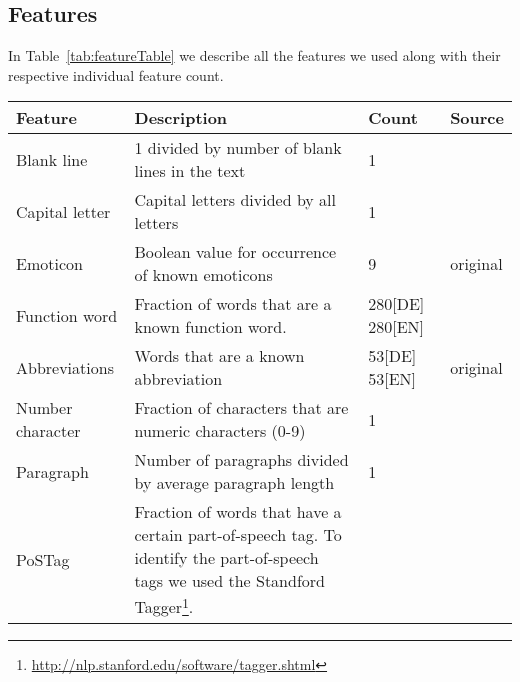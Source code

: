 \subsection{Features}
\label{sec:impl_features}

\begin{savenotes}


In Table~\ref{tab:featureTable} we describe all the features we used along with their respective individual feature count.


\begin{table}[ht!]
    \begin{center}
    \begin{tabular}{p{2.6cm}|p{6cm}|p{1.2cm}|p{1.2cm}}
    Feature                 & Description                                                               & Count             & Source\\ \hline \hline
    Blank line               & 1 divided by number of blank lines in the text                            & 1                 & \cite{de2001mining}\\ \hline
    Capital letter           & Capital letters divided by all letters                                    & 1                 & \cite{argamon2003style} \cite{de2001mining}\\ \hline
    Emoticon                & Boolean value for occurrence of known emoticons                           & 9                 & original\\ \hline
    Function word            & Fraction of words that are a known function word.                         & 280[DE] 280[EN]   & \cite{argamon2003style} \cite{de2001mining} \cite{madigan2005author} \cite{narayanan2012feasibility}\\ \hline
    Abbreviations           & Words that are a known abbreviation                                       & 53[DE] 53[EN]     & original\\ \hline
    Number character         & Fraction of characters that are numeric characters (0-9)                  & 1                 & \cite{narayanan2012feasibility}\\ \hline
    Paragraph               & Number of paragraphs divided by average paragraph length                  & 1                 & \cite{argamon2003style}\\ \hline
    PoSTag                  & Fraction of words that have a certain part-of-speech tag. To identify the part-of-speech tags we used the Standford Tagger\footnote{\url{http://nlp.stanford.edu/software/tagger.shtml}}.

\end{tabular}
\end{center}
\end{table}
\end{savenotes}
